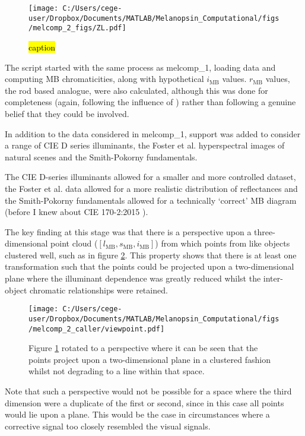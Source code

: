 \begin{figure}[h]
    \centering
    \texttt{[image: C:/Users/cege-user/Dropbox/Documents/MATLAB/Melanopsin\_Computational/figs/melcomp\_2\_figs/ZL.pdf]}
    \caption{\hl{caption}}
    \label{fig:ZL}
\end{figure} 

The script started with the same process as melcomp\_1, loading data and computing \ac{MB} chromaticities, along with hypothetical $i_{\text{MB}}$ values. $r_{\text{MB}}$ values, the rod based analogue, were also calculated, although this was done for completeness (again, following the influence of \cite{barrionuevo_contributions_2014}) rather than following a genuine belief that they could be involved.

In addition to the data considered in melcomp\_1, support was added to consider a range of CIE D series illuminants, the Foster et al. hyperspectral images of natural scenes and the Smith-Pokorny fundamentals.

The CIE D-series illuminants allowed for a smaller and more controlled dataset, the Foster et al. data allowed for a more realistic distribution of reflectances and the Smith-Pokorny fundamentals allowed for a technically `correct' \ac{MB} diagram (before I knew about CIE 170-2:2015 \cite{cie_cie_2015}).

The key finding at this stage was that there is a perspective upon a three-dimensional point cloud ($[l_{\text{MB}},s_{\text{MB}},i_{\text{MB}}]$) from which points from like objects clustered well, such as in figure \ref{fig:viewpoint}. This property shows that there is at least one transformation such that the points could be projected upon a two-dimensional plane where the illuminant dependence was greatly reduced whilst the inter-object chromatic relationships were retained. 

\begin{figure}[h]
    \centering
    \texttt{[image: C:/Users/cege-user/Dropbox/Documents/MATLAB/Melanopsin\_Computational/figs/melcomp\_2\_caller/viewpoint.pdf]}
    \caption{Figure \ref{fig:ZL} rotated to a perspective where it can be seen that the points project upon a two-dimensional plane in a clustered fashion whilst not degrading to a line within that space.}
    \label{fig:viewpoint}
\end{figure} 

Note that such a perspective would not be possible for a space where the third dimension were a duplicate of the first or second, since in this case all points would lie upon a plane. This would be the case in circumstances where a corrective signal too closely resembled the visual signals.

